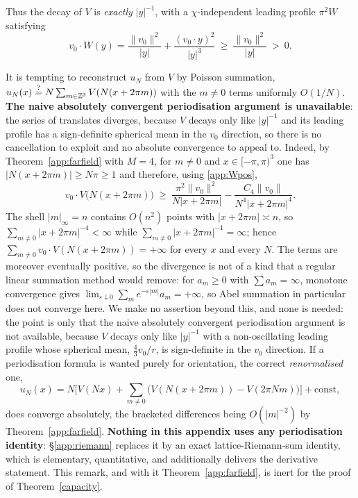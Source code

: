 Thus the decay of $V$ is \emph{exactly} $|y|^{-1}$, with a
$\chi$-independent leading profile $\pi^2W$ satisfying
\begin{equation}\label{app:Wpos}
v_0\cdot W(y)=\frac{\|v_0\|^2}{|y|}+\frac{(v_0\cdot y)^2}{|y|^3}
\ \ge\ \frac{\|v_0\|^2}{|y|}\ >\ 0 .
\end{equation}

\begin{remark}
\label{app:noperiod}
It is tempting to reconstruct $u_N$ from $V$ by Poisson summation,
$u_N(x)\stackrel{?}{=}N\sum_{m\in\mathbb Z^3}V(N(x+2\pi m))$ with the $m\neq0$
terms uniformly $O(1/N)$. \textbf{The naive absolutely convergent
periodisation argument is unavailable}: the series of translates
diverges, because $V$ decays only like $|y|^{-1}$ and its leading
profile has a sign-definite spherical mean in the $v_0$ direction, so
there is no cancellation to exploit and no absolute convergence to
appeal to. Indeed, by Theorem~\ref{app:farfield} with $M=4$, for
$m\neq0$ and $x\in[-\pi,\pi)^3$ one has $|N(x+2\pi m)|\ge N\pi\ge1$ and
therefore, using \eqref{app:Wpos},
\[
v_0\cdot V\big(N(x+2\pi m)\big)
\ \ge\ \frac{\pi^2\|v_0\|^2}{N|x+2\pi m|}
-\frac{C_4\|v_0\|}{N^4|x+2\pi m|^4}.
\]
The shell $|m|_\infty=n$ contains $O(n^2)$ points with
$|x+2\pi m|\asymp n$, so $\sum_{m\neq0}|x+2\pi m|^{-4}<\infty$ while
$\sum_{m\neq0}|x+2\pi m|^{-1}=\infty$; hence
$\sum_{m\neq0}v_0\cdot V(N(x+2\pi m))=+\infty$ for every $x$ and every
$N$. The terms are moreover eventually positive, so the divergence is
not of a kind that a regular linear summation method would remove: for
$a_m\ge0$ with $\sum a_m=\infty$, monotone convergence gives
$\lim_{\varepsilon\downarrow0}\sum_me^{-\varepsilon|m|}a_m=+\infty$, so
Abel summation in particular does not converge here. We make no
assertion beyond this, and none is needed: the point is only that the
naive absolutely convergent periodisation argument is not available,
because $V$ decays only like $|y|^{-1}$ with a non-oscillating leading
profile whose spherical mean, $\tfrac43v_0/r$, is sign-definite in the
$v_0$ direction. If a periodisation formula
is wanted purely for orientation, the correct \emph{renormalised} one,
\[
u_N(x)=N\Big[V(Nx)+\sum_{m\neq0}\big(V(N(x+2\pi m))-V(2\pi Nm)\big)\Big]
+\text{const},
\]
does converge absolutely, the bracketed differences being $O(|m|^{-2})$
by Theorem~\ref{app:farfield}. \textbf{Nothing in this appendix uses any
periodisation identity}: \S\ref{app:riemann} replaces it by an exact
lattice-Riemann-sum identity, which is elementary, quantitative, and
additionally delivers the derivative statement. This remark, and with it
Theorem~\ref{app:farfield}, is inert for the proof of
Theorem~\ref{capacity}.
\end{remark}

